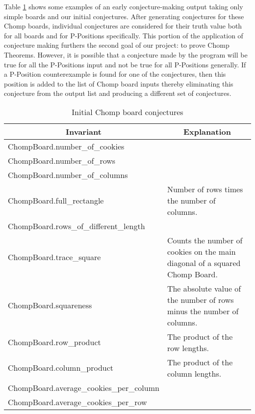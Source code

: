\documentclass{amsart}
\theoremstyle{definition}
\theoremstyle{remark}
\numberwithin{equation}{section}
\begin{document}







  Table \ref{initial_conjectures} shows some examples of an early conjecture-making output taking only simple boards and our initial conjectures. After generating conjectures for these Chomp boards, individual conjectures are considered for their truth value both for all boards and for P-Positions specifically. This portion of the application of conjecture making furthers the second goal of our project: to prove Chomp Theorems. However, it is possible that a conjecture made by the program will be true for all the P-Positions input and not be true for all P-Positions generally. If a P-Position counterexample is found for one of the conjectures, then this position is added to the list of Chomp board inputs thereby eliminating this conjecture from the output list and producing a different set of conjectures.

\begin{table}[h]
\centering
\begin{tabular}{@{}|l|p{7cm}|@{}}
\toprule
\multicolumn{1}{|c|}{{\bf Invariant}} & \multicolumn{1}{c|}{{\bf Explanation}} \\ \midrule
ChompBoard.number\_of\_cookies &  \\
\hline
ChompBoard.number\_of\_rows &  \\
\hline
ChompBoard.number\_of\_columns &  \\
\hline
ChompBoard.full\_rectangle & Number of rows times the number of columns. \\
\hline
ChompBoard.rows\_of\_different\_length &  \\
\hline
ChompBoard.trace\_square & Counts the number of cookies on the main diagonal of a squared Chomp Board. \\
\hline
ChompBoard.squareness & The absolute value of the number of rows minus the number of columns. \\
\hline
ChompBoard.row\_product & The product of the row lengths. \\
\hline
ChompBoard.column\_product & The product of the column lengths. \\
\hline
ChompBoard.average\_cookies\_per\_column &  \\
\hline
ChompBoard.average\_cookies\_per\_row &\\
\hline
\end{tabular}
\caption{Initial Chomp board conjectures}
\label{initial_conjectures}
\end{table}
\end{document}
